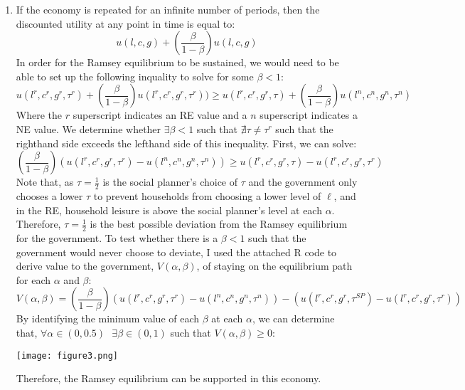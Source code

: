 \documentclass{article}
\begin{document}
\begin{enumerate}
	\item If the economy is repeated for an infinite number of periods, then the discounted utility at any point in time is equal to:
		\[
			u(l,c,g) + \left(\frac{\beta}{1-\beta}\right)u(l,c,g)
		\]
		In order for the Ramsey equilibrium to be sustained, we would need to be able to set up the following inquality to solve for some $\beta<1$:
		\[
			u(l^r,c^r,g^r,\tau^r) + \left(\frac{\beta}{1-\beta}\right)u(l^r,c^r,g^r,\tau^r))\geq 
			u(l^r,c^r,g^r,\tau) + \left(\frac{\beta}{1-\beta}\right)u(l^n,c^n,g^n,\tau^n)
		\]
		Where the $r$ superscript indicates an RE value and a $n$ superscript indicates a NE value. We determine whether $\exists\beta<1$ such that $\nexists\tau\neq\tau^r$ such that the righthand side exceeds the lefthand side of this inequality. First, we can solve:
		\[
			\left(\frac{\beta}{1-\beta}\right)\left(u(l^r,c^r,g^r,\tau^r)-u(l^n,c^n,g^n,\tau^n)\right)\geq u(l^r,c^r,g^r,\tau)-u(l^r,c^r,g^r,\tau^r)
		\]	
		Note that, as $\tau=\frac{1}{2}$ is the social planner's choice of $\tau$ and the government only chooses a lower $\tau$ to prevent households from choosing a lower level of $\ell$, and in the RE, household leisure is above the social planner's level at each $\alpha$. Therefore, $\tau=\frac{1}{2}$ is the best possible deviation from the Ramsey equilibrium for the government. To test whether there is a $\beta<1$ such that the government would never choose to deviate, I used the attached R code to derive value to the government, $V(\alpha,\beta)$, of staying on the equilibrium path for each $\alpha$ and $\beta$:
		\[
			V(\alpha,\beta)=\left(\frac{\beta}{1-\beta}\right)\left(u(l^r,c^r,g^r,\tau^r)-u(l^n,c^n,g^n,\tau^n)\right)-\left(u(l^r,c^r,g^r,\tau^{SP})-u(l^r,c^r,g^r,\tau^r)\right)
		\]
		By identifying the minimum value of each $\beta$ at each $\alpha$, we can determine that, ${\forall\alpha\in(0,0.5)\text{ }\exists\beta\in(0,1)}$ such that ${V(\alpha,\beta)\geq0}$:
		\begin{center}
			\texttt{[image: figure3.png]}
		\end{center}
		Therefore, the Ramsey equilibrium can be supported in this economy.
		
\end{enumerate}


\end{document}
